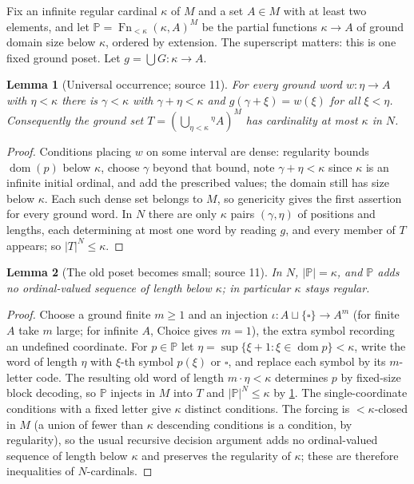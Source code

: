\documentclass[11pt,letterpaper]{article}
\numberwithin{equation}{section}
\newtheorem{lemma}[lemma]{Lemma}
\theoremstyle{definition}
\theoremstyle{remark}
\newcommand{\dom}{\operatorname{dom}}
\newcommand{\abs}[1]{\lvert#1\rvert}
\newcommand{\Fn}{\operatorname{Fn}}
\begin{document}
Fix an infinite regular cardinal $\kappa$ of $M$ and a set $A\in M$ with at least
two elements, and let $\mathbb P=\Fn_{<\kappa}(\kappa,A)^M$ be the partial functions
$\kappa\to A$ of ground domain size below $\kappa$, ordered by extension. The
superscript matters: this is one fixed ground poset. Let $g=\bigcup G:\kappa\to A$.

\begin{lemma}[Universal occurrence; source 11]\label{univ:gs:lem:word}
For every ground word $w:\eta\to A$ with $\eta<\kappa$ there is $\gamma<\kappa$ with
$\gamma+\eta<\kappa$ and $g(\gamma+\xi)=w(\xi)$ for all $\xi<\eta$. Consequently the
ground set $T=(\bigcup_{\eta<\kappa}{}^\eta A)^M$ has cardinality at most $\kappa$
in $N$.
\end{lemma}
\begin{proof}
Conditions placing $w$ on some interval are dense: regularity bounds $\dom(p)$
below $\kappa$, choose $\gamma$ beyond that bound, note $\gamma+\eta<\kappa$ since
$\kappa$ is an infinite initial ordinal, and add the prescribed values; the domain
still has size below $\kappa$. Each such dense set belongs to $M$, so genericity
gives the first assertion for every ground word. In $N$ there are only $\kappa$
pairs $(\gamma,\eta)$ of positions and lengths, each determining at most one word
by reading $g$, and every member of $T$ appears; so $\abs T^N\le\kappa$.
\end{proof}

\begin{lemma}[The old poset becomes small; source 11]\label{univ:gs:lem:posetsize}
In $N$, $\abs{\mathbb P}=\kappa$, and $\mathbb P$ adds no ordinal-valued sequence of
length below $\kappa$; in particular $\kappa$ stays regular.
\end{lemma}
\begin{proof}
Choose a ground finite $m\ge1$ and an injection $\iota:A\sqcup\{\square\}\to A^m$
(for finite $A$ take $m$ large; for infinite $A$, Choice gives $m=1$), the extra
symbol recording an undefined coordinate. For $p\in\mathbb P$ let
$\eta=\sup\{\xi+1:\xi\in\dom p\}<\kappa$, write the word of length $\eta$ with
$\xi$-th symbol $p(\xi)$ or $\square$, and replace each symbol by its $m$-letter
code. The resulting old word of length $m\cdot\eta<\kappa$ determines $p$ by
fixed-size block decoding, so $\mathbb P$ injects in $M$ into $T$ and
$\abs{\mathbb P}^N\le\kappa$ by \cref{univ:gs:lem:word}. The single-coordinate
conditions with a fixed letter give $\kappa$ distinct conditions. The forcing is
$<\kappa$-closed in $M$ (a union of fewer than $\kappa$ descending conditions is a
condition, by regularity), so the usual recursive decision argument adds no
ordinal-valued sequence of length below $\kappa$ and preserves the regularity of
$\kappa$; these are therefore inequalities of $N$-cardinals.
\end{proof}
\end{document}
